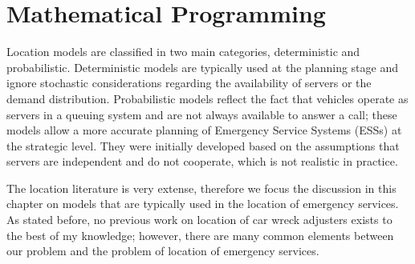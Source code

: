 \section{Mathematical Programming}
Location models
are classified in two main categories,
deterministic and probabilistic.
Deterministic models
are typically used at the planning stage
and ignore stochastic considerations
regarding the availability of servers
or the demand distribution.
Probabilistic models
reflect the fact that
vehicles operate as servers in a queuing system
and are not always available
to answer a call;
these models allow
a more accurate planning
of Emergency Service Systems (ESSs)
at the strategic level.
They were initially developed
based on the assumptions
that servers are independent
and do not cooperate,
which is not realistic in practice.

The location literature is very extense,
therefore
we focus the discussion in this chapter
on models
that are typically used
in the location of emergency services.
As stated before,
no previous work
on location of car wreck adjusters exists
to the best of my knowledge;
however,
there are many common elements
between our problem
and the problem of location of emergency services.



